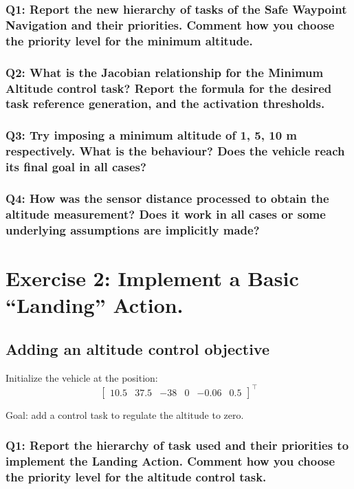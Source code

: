 \documentclass{article}
\begin{document}
\subsubsection{Q1: Report the new hierarchy of tasks of the Safe Waypoint Navigation and their priorities. Comment how you choose the priority level for the minimum altitude.}

\subsubsection{Q2: What is the Jacobian relationship for the Minimum Altitude control task? Report the formula for the desired task reference generation, and the activation thresholds.}

\subsubsection{Q3: Try imposing a minimum altitude of 1, 5, 10 m respectively. What is the behaviour? Does the vehicle reach its final goal in all cases?}

\subsubsection{Q4: How was the sensor distance processed to obtain the altitude measurement? Does it work in all cases or some underlying assumptions are implicitly made?}

\clearpage

\section{Exercise 2: Implement a Basic “Landing” Action.}
\subsection{Adding an altitude control objective}
Initialize the vehicle at the position:
\begin{displaymath}
\begin{bmatrix} 10.5 & 37.5 & -38 & 0 & -0.06 & 0.5 \end{bmatrix}^\top
\end{displaymath}

Goal: add a control task to regulate the altitude to zero.

\subsubsection{Q1: Report the hierarchy of task used and their priorities to implement the Landing Action. Comment how you choose the priority level for the altitude control task.}
\end{document}
